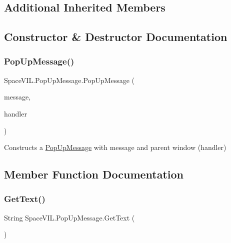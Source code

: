 \subsection*{Additional Inherited Members}


\subsection{Constructor \& Destructor Documentation}
\mbox{\label{class_space_v_i_l_1_1_pop_up_message_ab0331b1354c101d640ed34ec060b3bcf}} 
\subsubsection{\texorpdfstring{Pop\+Up\+Message()}{PopUpMessage()}}
{\footnotesize\ttfamily Space\+V\+I\+L.\+Pop\+Up\+Message.\+Pop\+Up\+Message (\begin{DoxyParamCaption}\item[{String}]{message,  }\item[{\mbox{\hyperlink{class_space_v_i_l_1_1_window_layout}{Window\+Layout}}}]{handler }\end{DoxyParamCaption})}



Constructs a \mbox{\hyperlink{class_space_v_i_l_1_1_pop_up_message}{Pop\+Up\+Message}} with message and parent window (handler) 



\subsection{Member Function Documentation}
\mbox{\label{class_space_v_i_l_1_1_pop_up_message_a88fb35dbe3c0ffb09d6ab49d4e179a21}} 
\subsubsection{\texorpdfstring{Get\+Text()}{GetText()}}
{\footnotesize\ttfamily String Space\+V\+I\+L.\+Pop\+Up\+Message.\+Get\+Text (\begin{DoxyParamCaption}{ }\end{DoxyParamCaption})}




